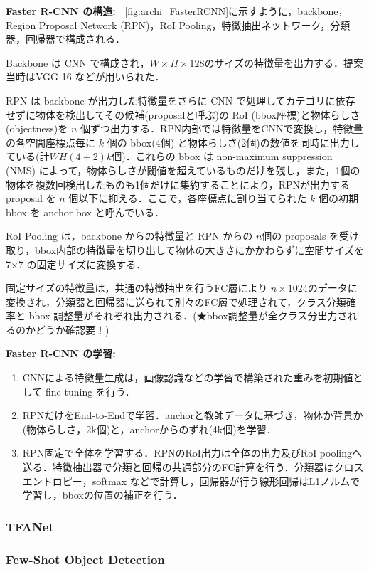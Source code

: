 \documentclass[originalpaper]{jsaiart}     %
\begin{document}
{\bf Faster R-CNN の構造:\ } \ref{fig:archi_FasterRCNN}に示すように，backbone，Region Proposal Network (RPN)，RoI Pooling，特徴抽出ネットワーク，分類器，回帰器で構成される．

Backbone は CNN で構成され，$W{\times}H{\times}128$のサイズの特徴量を出力する．提案当時はVGG-16 \cite{SimZis15}などが用いられた．

RPN は backbone が出力した特徴量をさらに CNN で処理してカテゴリに依存せずに物体を検出してその候補(proposalと呼ぶ)の RoI (bbox座標)と物体らしさ(objectness)を $n$ 個ずつ出力する．RPN内部では特徴量をCNNで変換し，特徴量の各空間座標点毎に $k$ 個の bbox(4個) と物体らしさ(2個)の数値を同時に出力している(計$WH(4{+}2)k$個)．これらの bbox は non-maximum suppression (NMS) によって，物体らしさが閾値を超えているものだけを残し，また，1個の物体を複数回検出したものも1個だけに集約することにより，RPNが出力するproposal を $n$ 個以下に抑える．ここで，各座標点に割り当てられた $k$ 個の初期 bbox を anchor box と呼んでいる．

RoI Pooling は，backbone からの特徴量と RPN からの $n$個の proposals を受け取り，bbox内部の特徴量を切り出して物体の大きさにかかわらずに空間サイズを 7{$\times$}7 の固定サイズに変換する．

固定サイズの特徴量は，共通の特徴抽出を行うFC層により $n{\times}1024$のデータに変換され，分類器と回帰器に送られて別々のFC層で処理されて，クラス分類確率と bbox 調整量がそれぞれ出力される．(★bbox調整量が全クラス分出力されるのかどうか確認要！)

{\bf Faster R-CNN の学習:\ } 
\begin{enumerate}
    \item CNNによる特徴量生成は，画像認識などの学習で構築された重みを初期値として fine tuning を行う．
    \item RPNだけをEnd-to-Endで学習．anchorと教師データに基づき，物体か背景か(物体らしさ，2k個)と，anchorからのずれ(4k個)を学習．
    \item RPN固定で全体を学習する．RPNのRoI出力は全体の出力及びRoI poolingへ送る．特徴抽出器で分類と回帰の共通部分のFC計算を行う．分類器はクロスエントロピー，softmax などで計算し，回帰器が行う線形回帰はL1ノルムで学習し，bboxの位置の補正を行う．
\end{enumerate}

\subsubsection{TFANet}
\subsubsection{Few-Shot Object Detection}
\end{document}

